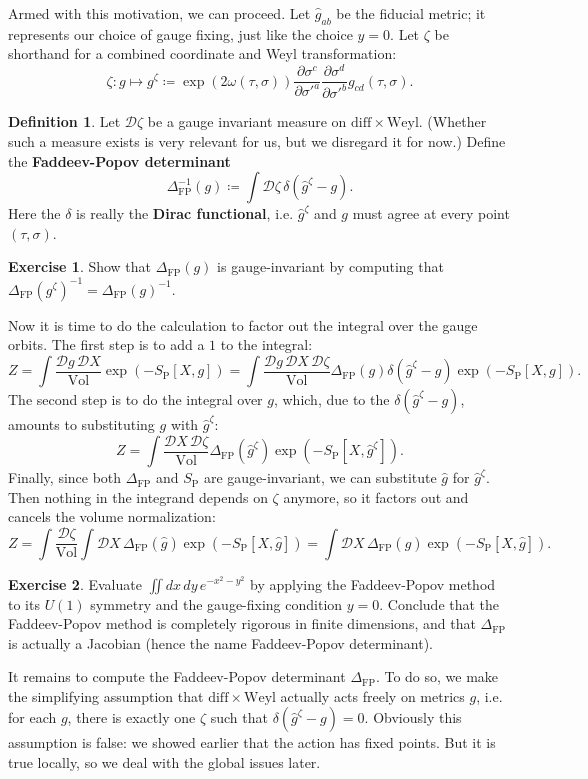 \documentclass{report}
\theoremstyle{plain}
\theoremstyle{definition}
\newtheorem{definition}[theorem]{Definition}
\newtheorem{exercise}{Exercise}[section]
\theoremstyle{remark}
\newcommand{\cD}{\mathcal{D}}
\newcommand{\diff}{\mathrm{diff}}
\newcommand{\Weyl}{\mathrm{Weyl}}
\DeclareMathOperator{\Vol}{Vol}
\newcommand{\pder}[2]{\frac{\partial #1}{\partial #2}}
\begin{document}
Armed with this motivation, we can proceed. Let $\hat{g}_{ab}$ be the
fiducial metric; it represents our choice of gauge fixing, just like
the choice $y = 0$. Let $\zeta$ be shorthand for a combined coordinate
and Weyl transformation:
\[ \zeta\colon g \mapsto g^\zeta \coloneqq \exp(2\omega(\tau,\sigma)) \pder{\sigma^c}{\sigma'^a} \pder{\sigma^d}{\sigma'^b} g_{cd}(\tau,\sigma). \]

\begin{definition}
  Let $\cD \zeta$ be a gauge invariant measure on $\diff \times
  \Weyl$. (Whether such a measure exists is very relevant for us, but
  we disregard it for now.) Define the {\bf Faddeev-Popov determinant}
  \[ \Delta_{\text{FP}}^{-1}(g) \coloneqq \int \cD \zeta \, \delta(\hat{g}^\zeta - g). \]
  Here the $\delta$ is really the {\bf Dirac functional}, i.e.
  $\hat{g}^\zeta$ and $g$ must agree at every point $(\tau, \sigma)$.
\end{definition}

\begin{exercise}
  Show that $\Delta_{\text{FP}}(g)$ is gauge-invariant by computing
  that $\Delta_{\text{FP}}(g^\zeta)^{-1} =
  \Delta_{\text{FP}}(g)^{-1}$.
\end{exercise}

Now it is time to do the calculation to factor out the integral over
the gauge orbits. The first step is to add a $1$ to the integral:
\[ Z = \int \frac{\cD g \, \cD X}{\Vol} \exp(-S_{\text{P}}[X, g]) = \int \frac{\cD g \, \cD X \, \cD \zeta}{\Vol} \Delta_{\text{FP}}(g) \delta(\hat{g}^\zeta - g) \exp(-S_{\text{P}}[X, g]). \]
The second step is to do the integral over $g$, which, due to the
$\delta(\hat{g}^\zeta - g)$, amounts to substituting $g$ with
$\hat{g}^\zeta$:
\[ Z = \int \frac{\cD X \, \cD \zeta}{\Vol} \Delta_{\text{FP}}(\hat{g}^\zeta)\exp(-S_{\text{P}}[X, \hat{g}^\zeta]). \]
Finally, since both $\Delta_{\text{FP}}$ and $S_{\text{P}}$ are
gauge-invariant, we can substitute $\hat{g}$ for $\hat{g}^\zeta$. Then
nothing in the integrand depends on $\zeta$ anymore, so it factors out
and cancels the volume normalization:
\[ Z = \int \frac{\cD \zeta}{\Vol} \int \cD X \, \Delta_{\text{FP}}(\hat{g}) \exp(-S_{\text{P}}[X, \hat{g}]) = \int \cD X \, \Delta_{\text{FP}}(\hat{g}) \exp(-S_{\text{P}}[X, \hat{g}]). \]

\begin{exercise}
  Evaluate $\iint dx \, dy \, e^{-x^2 - y^2}$ by applying the
  Faddeev-Popov method to its $U(1)$ symmetry and the gauge-fixing
  condition $y = 0$. Conclude that the Faddeev-Popov method is
  completely rigorous in finite dimensions, and that
  $\Delta_{\text{FP}}$ is actually a Jacobian (hence the name
  Faddeev-Popov determinant).
\end{exercise}

It remains to compute the Faddeev-Popov determinant
$\Delta_{\text{FP}}$. To do so, we make the simplifying assumption
that $\diff \times \Weyl$ actually acts freely on metrics $g$, i.e.
for each $g$, there is exactly one $\zeta$ such that
$\delta(\hat{g}^\zeta - g) = 0$. Obviously this assumption is false:
we showed earlier that the action has fixed points. But it is true
locally, so we deal with the global issues later.
\end{document}
